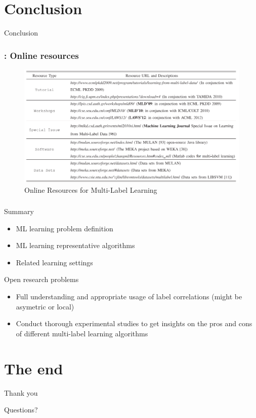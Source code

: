 \documentclass{beamer}
\begin{document}
\section{Conclusion}
\begin{frame}
\Huge{\centerline{Conclusion}}
\end{frame}
\begin{frame}
\frametitle{\insertsection : Online resources}
\begin{figure}
	\begin{center}
		\includegraphics[scale = 0.47]{images/online.png}
		\caption{Online Resources for Multi-Label Learning}
	\end{center}
\end{figure}
\end{frame}
\begin{frame}
\frametitle{\insertsection}
Summary
\begin{itemize}
	\item ML learning problem definition 
	\item ML learning representative algorithms
	\item Related learning settings
\end{itemize}

Open research problems
\begin{itemize}
	\item Full understanding and appropriate usage of label correlations (might be asymetric or local)
	\item Conduct thorough experimental studies to
get insights on the pros and cons of different multi-label
learning algorithms
\end{itemize}
\end{frame}

\section{The end}
\begin{frame}
\Huge{\centerline{Thank you}}
\Huge{\centerline{Questions?}}
\end{frame}
\end{document}
